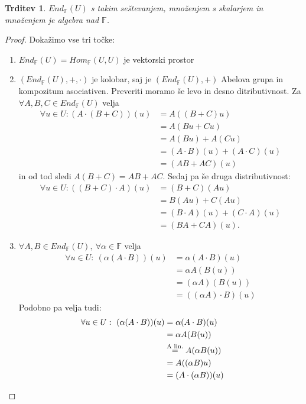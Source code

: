 \documentclass[10pt, a4paper]{article}
\newtheorem{trditev}[izr]{Trditev}
\newenvironment{noticeC}{%
  \tcolorbox[%
  notitle,
  empty,
  enhanced,  %
  breakable,
  coltext=black, 
  fontupper=\rmfamily,
  parbox=false,
  noparskip,
  sharp corners,
  boxrule=-1pt,  %
  frame hidden,
  left=7pt,  %
  right=7pt,
  top=5pt,
  bottom=5pt,
  before skip=2.5ex plus 2pt,
  after skip=2.5ex plus 2pt,
  overlay unbroken and last={%
  },
  ]}
{\endtcolorbox}
\newenvironment{dokaz}%
  {\begin{noticeC}\begin{proof}}%
  {\end{proof}\end{noticeC}}
\newcommand{\F}{\mathbb {F}}
\begin{document}
\begin{trditev}
    $End_\F(U)$ s takim seštevanjem, množenjem s skalarjem in množenjem je algebra nad $\F$.
\end{trditev}

\begin{dokaz}
    Dokažimo vse tri točke:
    \begin{enumerate}
        \item $End_\F(U) = Hom_\F (U,U)$ je vektorski prostor
        \item $(End_\F(U),+,\cdot)$ je kolobar, saj je $(End_\F (U),+)$ Abelova grupa in kompozitum asociativen.
        Preveriti moramo še levo in desno ditributivnost. Za $\forall A,B,C \in End_\F (U)$ velja
        \begin{align*}
                \forall u \in U: (A \cdot (B+C))(u) &= A((B+C)u)\\
                &= A(Bu + Cu)\\
                &= A(Bu) + A(Cu)\\
                &= (A \cdot B)(u) + (A \cdot C)(u)\\
                &= (AB + AC)(u)
        \end{align*}
        in od tod sledi $A(B+C) = AB + AC.$ Sedaj pa še druga distributivnost:
                    \begin{align*}
                        \forall u \in U: ((B+C) \cdot A)(u) &= (B+C)(Au)\\
                        &= B(Au) + C(Au)\\
                        &= (B \cdot A)(u) + (C \cdot A)(u)\\
                        &= (BA + CA)(u).
                    \end{align*}
        \item $\forall A,B \in End_\F (U),\ \forall \alpha \in \F$ velja
        \begin{align*}
            \forall u \in U:\ (\alpha (A \cdot B))(u) &= \alpha (A \cdot B)(u)\\
            &= \alpha A(B(u))\\
            &= (\alpha A)(B(u))\\
            &= ((\alpha A) \cdot B)(u)
        \end{align*}
        Podobno pa velja tudi:
        \begin{align*}
            \forall u \in U:\ (\alpha (A \cdot B))(u) &= \alpha (A \cdot B)(u)\\
            &= \alpha A(B(u))\\
            &\stackrel{\text{A lin.}}{=} A(\alpha B(u))\\
            &= A ((\alpha B)u)\\
            &= (A \cdot (\alpha B))(u) \qquad \qedhere
        \end{align*}
    \end{enumerate}
\end{dokaz}
\end{document}
